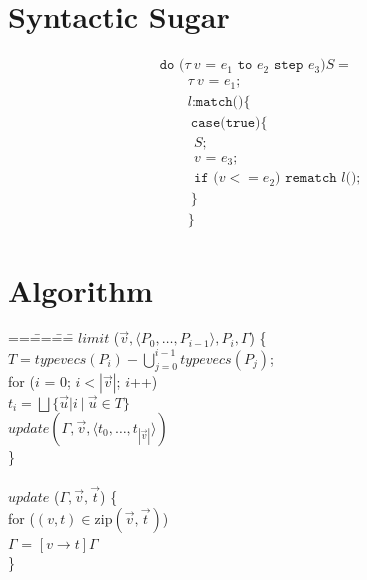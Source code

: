 \documentclass[a4j]{article}
\newcommand{\limit}{\textit{limit}}
\newcommand{\update}{\textit{update}}
\newcommand{\tuple}[1]{\langle #1 \rangle}
\newcommand{\typevecs}{\textit{typevecs}}
\newcommand{\dostmt}{
  \texttt{do (}\tau\ v \texttt{ = } e_1 \texttt{ to } e_2 \texttt{ step } e_3\texttt{)} S
}
\begin{document}
\section{Syntactic Sugar}
\[
\begin{array}{l}
\dostmt =\\
\qquad \tau\ v \texttt{ = } e_1\texttt{;}\\
\qquad l\texttt{:match()}\{\\
\qquad\ \texttt{case(true)\{ }\\
\qquad\ \ S\texttt{; }\\
\qquad\ \ v \texttt{ = } e_3 \texttt{;}\\
\qquad\ \ \texttt{if (}v <= e_2\texttt{) rematch }l\texttt{();}\\
\qquad\ \texttt{\}}\\
\qquad \texttt{\}}
\end{array}
\]

\section{Algorithm}

\begin{tabbing}
==\===\===\=\kill
$\limit$ ($\vec{v}, \tuple{P_0,\ldots,P_{i-1}}, P_i, \Gamma$) \{\\
\>$T = \typevecs(P_i) - \displaystyle\bigcup_{j = 0}^{i-1} \typevecs(P_j)$;\\
\>for ($i$ = 0; $i < |\vec{v}|$; $i$++)\\
\>\>$t_i = \displaystyle\bigsqcup\{\vec{u}|i\ |\ \vec{u} \in T\}$\\
\>$\update(\Gamma, \vec{v}, \tuple{t_0,\ldots,t_{|\vec{v}|}})$\\
\}\\
\\
$\update$ ($\Gamma, \vec{v}, \vec{t}$) \{\\
\>for ($(v, t) \in \textrm{zip}(\vec{v}, \vec{t})$)\\
\>\>$\Gamma$ = $[v \to t]\Gamma$\\
\}
\end{tabbing}
\end{document}
